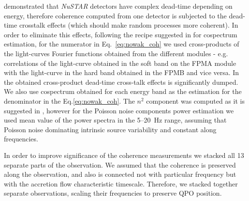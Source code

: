 \documentclass[a4paper,fleqn,usenatbib]{mnras}
\begin{document}
\citet{2015ApJ...800..109B} demonstrated that {\it NuSTAR} detectors have complex dead-time depending on energy, therefore coherence computed from one detector is subjected to the dead-time crosstalk effects (which should make random processes more coherent).
In order to eliminate this effects, following the recipe suggested in \cite{2015ApJ...800..109B} for cospectrum estimation, for the numerator in Eq.~\ref{eq:nowak_coh} we used cross-products of the light-curves Fourier functions obtained from the different modules - e.g. correlations of the light-curve obtained in the soft band on the FPMA module with the light-curve in the hard band obtained in the FPMB and vice versa.
In the obtained cross-product dead-time cross-talk effects is significantly dumped.
We also use cospectrum obtained for each energy band as the estimation for the denominator in the Eq.\ref{eq:nowak_coh}.
The $n^2$ component was computed as it is suggested in \citep{1997ApJ...474L..43V}, however for the Poisson noise components power estimation we used mean value of the power spectra in the 5--20~Hz range, assuming that Poisson noise dominating intrinsic source variability and constant along frequencies. 

In order to improve significance of the coherence measurements we stacked all 13 separate parts of the observation. 
We assumed that the coherence is preserved along the observation, and also is connected not with particular frequency but with the accretion flow characteristic timescale. 
Therefore, we stacked together separate observations, scaling their frequencies to preserve QPO position.

\end{document}
